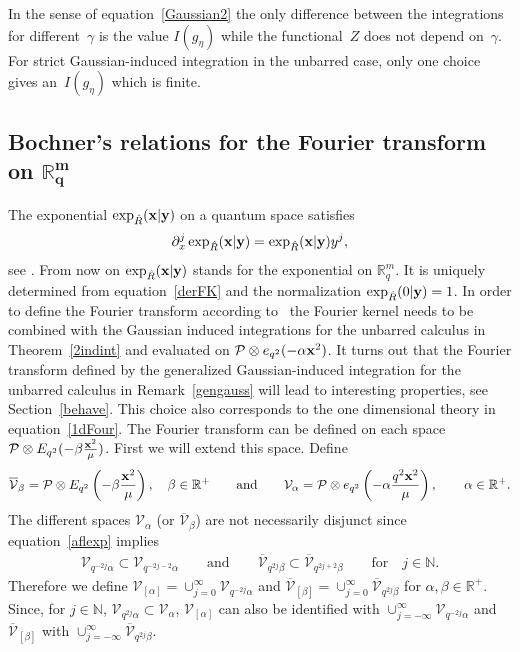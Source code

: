\documentclass[pdftex]{sigma}
\newcommand{\mR}{\mathbb{R}}
\newcommand{\mN}{\mathbb{N}}
\newcommand{\cP}{\mathcal{P}}
\newcommand{\cV}{\mathcal{V}}
\numberwithin{equation}{section}
\begin{document}
In the sense of equation~\eqref{Gaussian2} the only dif\/ference between the integrations for dif\/ferent~$\gamma$ is the value $I(g_\eta)$ while the functional~$Z$ does not depend on~$\gamma$. For strict Gaussian-induced integration in the unbarred case, only one choice gives an~$I(g_\eta)$ which is f\/inite.



\subsection[Bochner's relations for the Fourier transform on $\mR^m_q$]{Bochner's relations for the Fourier transform on $\boldsymbol{\mR^m_q}$}\label{boch}

The exponential $\exp_{\hat{R}}(\bold{x}|\bold{y})$ on a quantum space satisf\/ies
\begin{gather}
\label{derFK}
\partial_x^j\exp_{\hat{R}}(\bold{x}|\bold{y}) = \exp_{\hat{R}}(\bold{x}|\bold{y})y^j,
\end{gather}
see \cite{MR1303081, MR1235979, MR2099760}. From now on $\exp_{\hat{R}}(\bold{x}|\bold{y})$ stands for the exponential on $\mR^m_q$. It is uniquely determined from equation~\eqref{derFK} and the normalization $\exp_{\hat{R}}(0|\bold{y})=1$. In order to def\/ine the Fourier transform according to~\cite{MR1303081} the Fourier kernel needs to be combined with the Gaussian induced integrations for the unbarred calculus in Theorem~\ref{2indint} and evaluated on  $\cP\otimes e_{q^2}(-\alpha\bold{x}^2)$. It turns out that the Fourier transform def\/ined by the generalized Gaussian-induced integration for the unbarred calculus in Remark~\ref{gengauss} will lead to interesting properties, see Section~\ref{behave}. This choice also corresponds to the one dimensional theory in equation~\eqref{1dFour}. The Fourier transform can be def\/ined on each space $\cP\otimes E_{q^2}(-\beta \frac{\bold{x}^2}{\mu})$. First we will extend this space. Def\/ine
\begin{gather*}
\overline{\cV}_\beta =\cP\otimes E_{q^2}\left(-\beta \frac{\bold{x}^2}{\mu}\right),\quad\beta\in\mR^+ \qquad \mbox{and} \qquad \cV_\alpha=\cP\otimes e_{q^2}\left(-\alpha\frac{q^2\bold{x}^2}{\mu}\right),\qquad\alpha\in\mR^+.
\end{gather*}
The dif\/ferent spaces $\cV_\alpha$ (or $\overline{\cV}_\beta$) are not necessarily disjunct since equation~\eqref{aflexp} implies
\begin{gather*}
\cV_{q^{-2j}\alpha}\subset\cV_{q^{-2j-2}\alpha} \qquad \mbox{and} \qquad \overline{\cV}_{q^{2j}\beta}\subset\overline{\cV}_{q^{2j+2}\beta}\qquad\mbox{for}\quad j\in\mN.
\end{gather*}
Therefore we def\/ine $\cV_{[\alpha]}=\cup_{j=0}^\infty \cV_{q^{-2j}\alpha}$ and $\overline{\cV}_{[\beta]}=\cup_{j=0}^\infty \overline{\cV}_{q^{2j}\beta}$ for $\alpha,\beta\in\mR^+$. Since, for $j\in\mN$, $\cV_{q^{2j}\alpha}\subset\cV_{\alpha}$,  $\cV_{[\alpha]}$ can also be identif\/ied with $\cup_{j=-\infty}^\infty \cV_{q^{-2j}\alpha}$ and $\overline{\cV}_{[\beta]}$ with $\cup_{j=-\infty}^\infty \overline{\cV}_{q^{2j}\beta}$.
\end{document}
